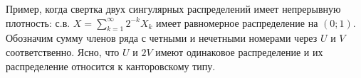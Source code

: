 \begin{problem}
\begin{remark}
Пример, когда свертка двух сингулярных распределений имеет непрерывную плотность: с.в. $X=\sum _{k=1}^{\infty }2^{-k} X_{k}  $ имеет равномерное распределение на $\left(0;1\right)$. Обозначим сумму членов ряда с четными и нечетными номерами через $U$ и $V$ соответственно. Ясно, что $U$ и $2V$ имеют одинаковое распределение и их распределение относится к канторовскому типу.
\end{remark}

\end{problem}